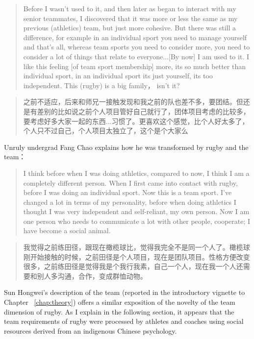 \begin{CJK}{UTF8}{gbsn}
    \begin{quotation}
     Before I wasn’t used to it, and then later as began to interact with my senior teammates, I discovered that it was more or less the same as my previous (athletics) team, but just more cohesive.  But there was still a difference, for example in an individual sport you need to manage yourself and that's all, whereas team sports you need to consider more, you need to consider a lot of things that relate to everyone...[By now] I am used to it. I like this feeling [of team sport membership] more, its so much better than individual sport, in an individual sport its just yourself, its too independent. This (rugby) is a big family， isn’t it?
    \end{quotation}

    \begin{quotation}
      之前不适应，后来和师兄一接触发现和我之前的队也差不多，要团结。但还是有差别的比如说之前个人项目管好自己就行了，团体项目考虑的比较多，要考虑好多大家一起的东西...习惯了。更喜欢这个感觉，比个人好太多了，个人只不过自己，个人项目太独立了，这个是个大家么 \\
    \end{quotation}

  Unruly undergrad Fang Chao explains how he was transformed by rugby and the team：

      \begin{quotation}
        I think before when I was doing athletics, compared to now, I think I am a completely different person.  When I first came into contact with rugby, before I was doing an individual sport.  Now this is a team sport. I've changed a lot in terms of my personality, before when doing athletics I thought I was very independent and self-reliant, my own person.  Now I am one person who needs to communicate a lot with other people, cooperate; I have become a social animal.
      \end{quotation}

      \begin{quotation}
        我觉得之前练田径，跟现在橄榄球比，觉得我完全不是同一个人了。橄榄球刚开始接触的时候，之前田径是个人项目，现在是团队项目。性格方便改变很多，之前练田径是觉得我是个我行我素，自己一个人，现在我一个人还需要和别人多沟通，合作，变成群恤动物。
      \end{quotation}

Sun Hongwei's description of the team (reported in the introductory vignette to Chapter ~\ref{chap:theory}) offers a similar exposition of the novelty of the team dimension of rugby. As I explain in the following section, it appears that the team requirements of rugby were processed by athletes and coaches using social resources derived from an indigenous Chinese psychology.



\end{CJK}

